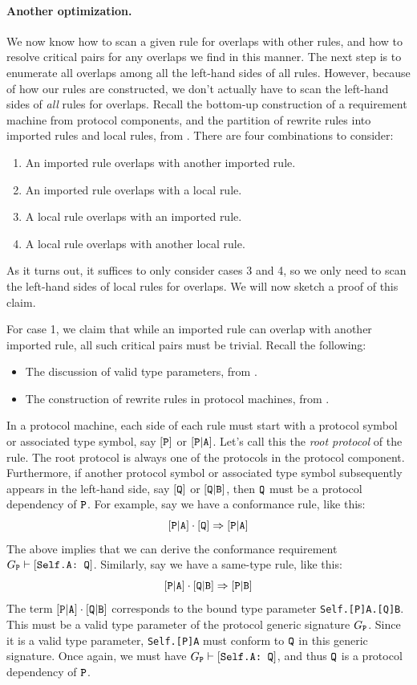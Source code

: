 \documentclass[../generics]{subfiles}
\begin{document}
\paragraph{Another optimization.}
We now know how to scan a given rule for overlaps with other rules, and how to resolve critical pairs for any overlaps we find in this manner. The next step is to enumerate all overlaps among all the left-hand sides of all rules. However, because of how our rules are constructed, we don't actually have to scan the left-hand sides of \emph{all} rules for overlaps. Recall the bottom-up construction of a requirement machine from protocol components, and the partition of rewrite rules into imported rules and local rules, from . There are four combinations to consider:
\begin{enumerate}
\item An imported rule overlaps with another imported rule.
\item An imported rule overlaps with a local rule.
\item A local rule overlaps with an imported rule.
\item A local rule overlaps with another local rule.
\end{enumerate}
As it turns out, it suffices to only consider cases 3 and 4, so we only need to scan the left-hand sides of local rules for overlaps. We will now sketch a proof of this claim.

For case 1, we claim that while an imported rule can overlap with another imported rule, all such critical pairs must be trivial. Recall the following:
\begin{itemize}
\item The discussion of valid type parameters, from .
\item The construction of rewrite rules in protocol machines, from .
\end{itemize}
In a protocol machine, each side of each rule must start with a protocol symbol or associated type symbol, say $[\texttt{P}]$ or $[\texttt{P}|\texttt{A}]$. Let's call this the \emph{root protocol} of the rule. The root protocol is always one of the protocols in the protocol component. Furthermore, if another protocol symbol or associated type symbol subsequently appears in the left-hand side, say $[\texttt{Q}]$ or $[\texttt{Q}|\texttt{B}]$, then  $\texttt{Q}$ must be a protocol dependency of $\texttt{P}$. For example, say we have a conformance rule, like this:
\[
[\texttt{P}|\texttt{A}] \cdot [\texttt{Q}] \Rightarrow [\texttt{P}|\texttt{A}]
\]
The above implies that we can derive the conformance requirement $G_{\texttt{P}} \vdash[\texttt{Self.A:~Q}]$. Similarly, say we have a same-type rule, like this:
\[
[\texttt{P}|\texttt{A}] \cdot [\texttt{Q}|\texttt{B}] \Rightarrow [\texttt{P}|\texttt{B}]
\]
The term $[\texttt{P}|\texttt{A}] \cdot [\texttt{Q}|\texttt{B}]$ corresponds to the bound type parameter \texttt{Self.[P]A.[Q]B}. This must be a valid type parameter of the protocol generic signature $G_{\texttt{P}}$. Since it is a valid type parameter, \texttt{Self.[P]A} must conform to $\texttt{Q}$ in this generic signature. Once again, we must have $G_{\texttt{P}} \vdash[\texttt{Self.A:~Q}]$, and thus $\texttt{Q}$ is a protocol dependency of $\texttt{P}$.
\end{document}
